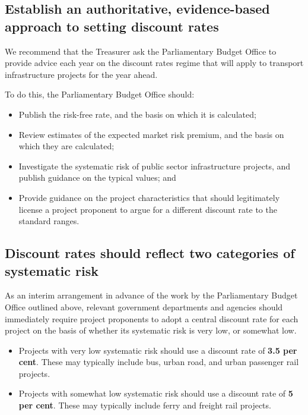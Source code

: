 \documentclass{grattan}
\begin{document}
\begin{recommendations}


\subsection*{Establish an authoritative, evidence-based approach to setting discount rates}

We recommend that the Treasurer ask the Parliamentary Budget Office to provide advice each year on the discount rates regime that will apply to transport infrastructure projects for the year ahead.

To do this, the Parliamentary Budget Office should:
\begin{itemize}
\item Publish the risk-free rate, and the basis on which it is calculated;
\item Review estimates of the expected market risk premium, and the basis on which they are calculated;
\item Investigate the systematic risk of public sector infrastructure projects, and publish guidance on the typical values; and
\item Provide guidance on the project characteristics that should legitimately license a project proponent to argue for a different discount rate to the standard ranges. 
\end{itemize}

\subsection*{Discount rates should reflect two categories of systematic risk}

As an interim arrangement in advance of the work by the Parliamentary Budget Office outlined above, relevant government departments and agencies should immediately require project proponents to adopt a central discount rate for each project on the basis of whether its systematic risk is very low, or somewhat low.
\begin{itemize}
    \item Projects with very low systematic risk should use a discount rate of \textbf{3.5 per cent}. These may typically include bus, urban road, and urban passenger rail projects.
    \item Projects with somewhat low systematic risk should use a discount rate of \textbf{5 per cent}. These may typically include ferry and freight rail projects.
\end{itemize}


\end{recommendations}
\end{document}
